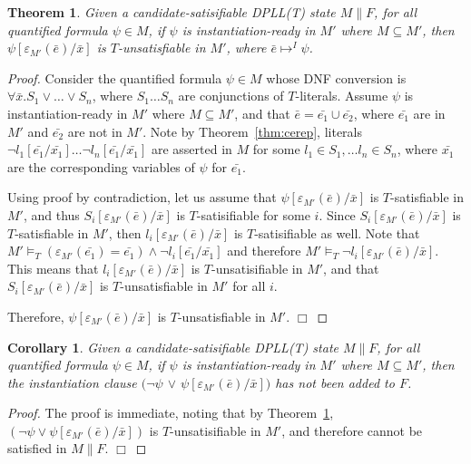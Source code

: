 \documentclass{llncs}
\newtheorem{thm}{Theorem}
\newtheorem{cor}{Corollary}
\begin{document}
\begin{thm}
\label{thm:instready}
Given a candidate-satisifiable DPLL(T) state $M \parallel F$, for all quantified formula $\psi \in M$, if $\psi$ is instantiation-ready in $M'$ where $M \subseteq M'$, then $\psi[\varepsilon_{M'}( \bar{e} )/\bar{x}]$ is $T$-unsatisfiable in $M'$, where $\bar{e} \mapsto^I \psi$.
\end{thm}
\begin{proof}
Consider the quantified formula $\psi \in M$ whose DNF conversion is $\forall \bar{x}. S_1 \vee \ldots \vee S_n$, where $S_1 \ldots S_n$ are conjunctions of $T$-literals.
Assume $\psi$ is instantiation-ready in $M'$ where $M \subseteq M'$, and that $\bar{e} = \bar{e_1} \cup \bar{e_2}$, where $\bar{e_1}$ are in $M'$ and $\bar{e_2}$ are not in $M'$.
Note by Theorem~\ref{thm:cerep}, literals $\neg l_1 [\bar{e_1}/\bar{x_1}] \ldots \neg l_n [ \bar{e_1}/\bar{x_1} ]$ are asserted in $M$ for some $l_1 \in S_1, \ldots l_n \in S_n$, where $\bar{x_1}$ are the corresponding variables of $\psi$ for $\bar{e_1}$.

Using proof by contradiction, let us assume that $\psi[\varepsilon_{M'}( \bar{e} )/\bar{x}]$ is $T$-satisfiable in $M'$, and thus $S_i[\varepsilon_{M'}( \bar{e} )/\bar{x}]$ is $T$-satisifiable for some $i$.
Since $S_i[\varepsilon_{M'}(\bar{e})/\bar{x}]$ is $T$-satisfiable in $M'$, then $l_i[\varepsilon_{M'}( \bar{e} )/\bar{x}]$ is $T$-satisifiable as well.
Note that $M' \models_T (\varepsilon_{M'}(\bar{e_1}) = \bar{e_1}) \wedge \neg l_i[\bar{e_1}/\bar{x_1}]$ and therefore $M' \models_T \neg l_i[\varepsilon_{M'}(\bar{e})/\bar{x}]$.
This means that $l_i[\varepsilon_{M'}(\bar{e})/\bar{x}]$ is $T$-unsatisifiable in $M'$, and that $S_i[\varepsilon_{M'}(\bar{e})/\bar{x}]$ is $T$-unsatisfiable in $M'$ for all $i$.

Therefore, $\psi[\varepsilon_{M'}( \bar{e} )/\bar{x}]$ is $T$-unsatisfiable in $M'$. $\Box$
\end{proof}

\begin{cor}
\label{cor:instready}
Given a candidate-satisifiable DPLL(T) state $M \parallel F$, for all quantified formula $\psi \in M$,
if $\psi$ is instantiation-ready in $M'$ where $M \subseteq M'$, then the instantiation clause $( \neg \psi$ $\vee$ $\psi[\varepsilon_{M'}( \bar{e} )/\bar{x}])$ has not been added to $F$.
\end{cor}
\begin{proof}
The proof is immediate, noting that by Theorem~\ref{thm:instready}, $( \neg \psi \vee \psi[\varepsilon_{M'}( \bar{e} )/\bar{x}])$ is $T$-unsatisifiable in $M'$, and therefore cannot be satisfied in $M \parallel F$. $\Box$
\end{proof}
\end{document}
